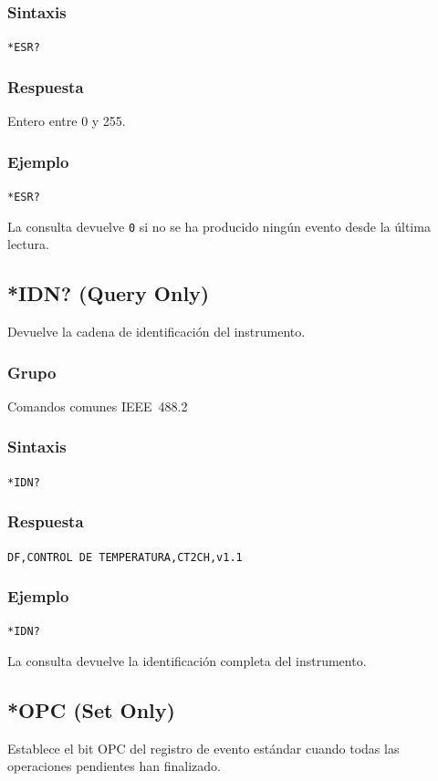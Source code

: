\subsubsection*{Sintaxis}
\texttt{*ESR?}

\subsubsection*{Respuesta}
Entero entre 0 y 255.

\subsubsection*{Ejemplo}
\texttt{*ESR?}

La consulta devuelve \texttt{0} si no se ha producido ningún evento desde la última lectura.

\subsection*{*IDN? (Query Only)}

Devuelve la cadena de identificación del instrumento.

\subsubsection*{Grupo}
Comandos comunes IEEE~488.2

\subsubsection*{Sintaxis}
\texttt{*IDN?}

\subsubsection*{Respuesta}
\texttt{DF,CONTROL DE TEMPERATURA,CT2CH,v1.1}

\subsubsection*{Ejemplo}
\texttt{*IDN?}

La consulta devuelve la identificación completa del instrumento.

\subsection*{*OPC (Set Only)}

Establece el bit OPC del registro de evento estándar cuando todas las operaciones pendientes han finalizado.

